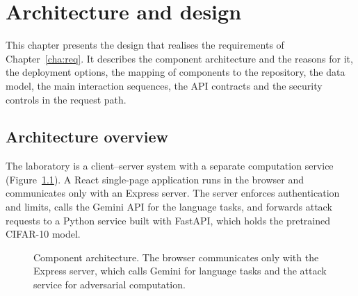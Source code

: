 \chapter{Architecture and design}
\label{cha:arch}

This chapter presents the design that realises the requirements of Chapter~\ref{cha:req}. It describes the component architecture and the reasons for it, the deployment options, the mapping of components to the repository, the data model, the main interaction sequences, the API contracts and the security controls in the request path.

\section{Architecture overview}
\label{sec:arch-overview}

The laboratory is a client--server system with a separate computation service (Figure~\ref{fig:arch}). A React single-page application runs in the browser and communicates only with an Express server. The server enforces authentication and limits, calls the Gemini API for the language tasks, and forwards attack requests to a Python service built with FastAPI, which holds the pretrained CIFAR-10 model.

\begin{figure}[htbp]
\centering
{}
\caption{Component architecture. The browser communicates only with the Express server, which calls Gemini for language tasks and the attack service for adversarial computation.}
\label{fig:arch}
\end{figure}

